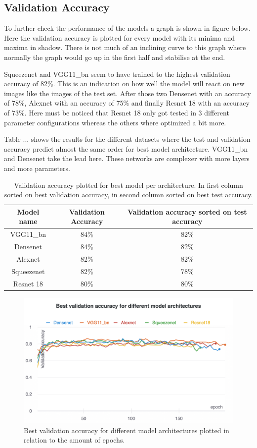 		\subsection{Validation Accuracy}
To further check the performance of the models a graph is shown in figure below. Here the validation accuracy is plotted for every model with its minima and maxima in shadow. There is not much of an inclining curve to this graph where normally the graph would go up in the first half and stabilise at the end.

Squeezenet and VGG11\_bn  seem to have trained to the highest validation accuracy of 82\%. This is an indication on how well the model will react on new images like the images of the test set. After those two Densenet with an accuracy of 78\%, Alexnet with an accuracy of 75\% and finally Resnet 18 with an accuracy of 73\%. Here must be noticed that Resnet 18 only got tested in 3 different parameter configurations whereas the others where optimized a bit more.
	
	
	Table ... shows the results for the different datasets where the test and validation accuracy predict almost the same order for best model architecture. VGG11\_bn and Densenet take the lead here. These networks are complexer with more layers and more parameters.
	\begin{table}[h!]
			\begin{tabular}{ c | c c }
			Model name		& Validation Accuracy 	& Validation accuracy sorted on test accuracy	\\ \hline
			VGG11\_bn 			& 84\%						& 82\%					\\
		 	Densenet 				& 84\%						& 82\% 				\\ 
		 	Alexnet			& 82\%							& 82\%					\\
		 	Squeezenet			& 82\%							& 78\%					\\
		 	Resnet 18 		& 80\%						& 80\%					\\
			\end{tabular}
			\caption{Validation accuracy plotted for best model per architecture. In first column sorted on best validation accuracy, in second column sorted on best test accuracy.}
		\end{table}
		
	\begin{figure}[hbtp]
	\centering
	\includegraphics[width=0.6\linewidth]{fig/results/wandb/spaghetti_dataset/charts/Section-13-Panel-0-yf0a5rsos}
	\caption{Best validation accuracy for different model architectures plotted in relation to the amount of epochs.}
	\end{figure}

